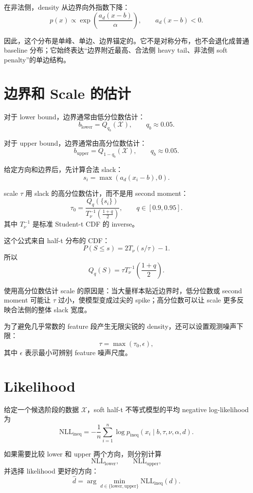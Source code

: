 \documentclass[11pt]{ctexart}
\begin{document}
在非法侧，density 从边界向外指数下降：
\[
 p(x)\propto \exp\left(\frac{a_d(x-b)}{\alpha}\right),
 \qquad a_d(x-b)<0.
\]

因此，这个分布是单峰、单边、边界锚定的。它不是对称分布，也不会退化成普通 baseline 分布；它始终表达“边界附近最高、合法侧 heavy tail、非法侧 soft penalty”的单边结构。

\section{边界和 Scale 的估计}

对于 lower bound，边界通常由低分位数估计：
\[
 b_{\mathrm{lower}} = Q_{q_b}(\mathcal{X}),
 \qquad q_b\approx 0.05.
\]

对于 upper bound，边界通常由高分位数估计：
\[
 b_{\mathrm{upper}} = Q_{1-q_b}(\mathcal{X}),
 \qquad q_b\approx 0.05.
\]

给定方向和边界后，先计算合法 slack：
\[
 s_i = \max(a_d(x_i-b),0).
\]

scale $\tau$ 用 slack 的高分位数估计，而不是用 second moment：
\[
 \tau_0
 =
 \frac{Q_q(\{s_i\})}{T_\nu^{-1}\left(\frac{1+q}{2}\right)},
 \qquad q\in[0.9,0.95].
\]
其中 $T_\nu^{-1}$ 是标准 Student-t CDF 的 inverse。

这个公式来自 half-t 分布的 CDF：
\[
 P(S\le s)=2T_\nu(s/\tau)-1.
\]
所以
\[
 Q_q(S)=\tau T_\nu^{-1}\left(\frac{1+q}{2}\right).
\]

使用高分位数估计 scale 的原因是：当大量样本贴近边界时，低分位数或 second moment 可能让 $\tau$ 过小，使模型变成过尖的 spike；高分位数可以让 scale 更多反映合法侧的整体 slack 宽度。

为了避免几乎常数的 feature 段产生无限尖锐的 density，还可以设置观测噪声下限：
\[
 \tau = \max(\tau_0,\epsilon),
\]
其中 $\epsilon$ 表示最小可辨别 feature 噪声尺度。

\section{Likelihood}

给定一个候选阶段的数据 $\mathcal{X}$，soft half-t 不等式模型的平均 negative log-likelihood 为
\[
 \mathrm{NLL}_{\mathrm{ineq}}
 =
 -\frac{1}{n}\sum_{i=1}^n
 \log p_{\mathrm{ineq}}(x_i\mid b,\tau,\nu,\alpha,d).
\]

如果需要比较 lower 和 upper 两个方向，则分别计算
\[
 \mathrm{NLL}_{\mathrm{lower}},
 \qquad
 \mathrm{NLL}_{\mathrm{upper}},
\]
并选择 likelihood 更好的方向：
\[
 \hat d = \arg\min_{d\in\{\mathrm{lower},\mathrm{upper}\}}
 \mathrm{NLL}_{\mathrm{ineq}}(d).
\]
\end{document}
